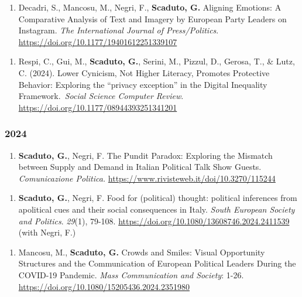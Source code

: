 \documentclass[10pt,]{article}
\providecommand{\tightlist}{%
  \setlength{\itemsep}{0pt}\setlength{\parskip}{0pt}}
\begin{document}
\begin{enumerate}
\def\labelenumi{\arabic{enumi}.}
\setcounter{enumi}{7}
\tightlist
\item
  Decadri, S., Mancosu, M., Negri, F., \textbf{Scaduto, G.} Aligning
  Emotions: A Comparative Analysis of Text and Imagery by European Party
  Leaders on Instagram. \emph{The International Journal of
  Press/Politics}. \url{https://doi.org/10.1177/19401612251339107}
\end{enumerate}

\begin{enumerate}
\def\labelenumi{\arabic{enumi}.}
\setcounter{enumi}{6}
\tightlist
\item
  Respi, C., Gui, M., \textbf{Scaduto, G.}, Serini, M., Pizzul, D.,
  Gerosa, T., \& Lutz, C. (2024). Lower Cynicism, Not Higher Literacy,
  Promotes Protective Behavior: Exploring the ``privacy exception'' in
  the Digital Inequality Framework.~\emph{Social Science Computer
  Review}. \url{https://doi.org/10.1177/08944393251341201}
\end{enumerate}

\subsubsection{2024}\label{section-1}

\begin{enumerate}
\def\labelenumi{\arabic{enumi}.}
\setcounter{enumi}{5}
\tightlist
\item
  \textbf{Scaduto, G.}, Negri, F. The Pundit Paradox: Exploring the
  Mismatch between Supply and Demand in Italian Political Talk Show
  Guests. \emph{Comunicazione Politica.}
  \url{https://www.rivisteweb.it/doi/10.3270/115244}
\end{enumerate}

\begin{enumerate}
\def\labelenumi{\arabic{enumi}.}
\setcounter{enumi}{4}
\tightlist
\item
  \textbf{Scaduto, G.}, Negri, F. Food for (political) thought:
  political inferences from apolitical cues and their social
  consequences in Italy. \emph{South European Society and Politics}.
  \emph{29}(1), 79-108.
  \url{https://doi.org/10.1080/13608746.2024.2411539} (with Negri, F.)
\end{enumerate}

\begin{enumerate}
\def\labelenumi{\arabic{enumi}.}
\setcounter{enumi}{3}
\tightlist
\item
  Mancosu, M., \textbf{Scaduto, G.} Crowds and Smiles: Visual
  Opportunity Structures and the Communication of European Political
  Leaders During the COVID-19 Pandemic. \emph{Mass Communication and
  Society}: 1-26. \url{https://doi.org/10.1080/15205436.2024.2351980}
\end{enumerate}
\end{document}
